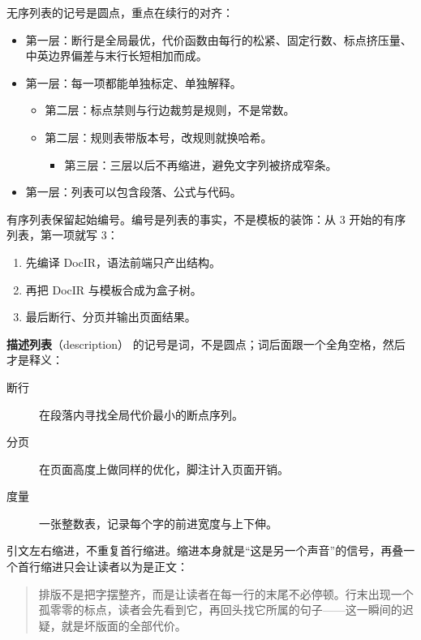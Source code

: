 \documentclass{article}
\newcommand{\term}[2]{\textbf{#1}（#2）}
\begin{document}
无序列表的记号是圆点，重点在续行的对齐：

\begin{itemize}
\item 第一层：断行是全局最优，代价函数由每行的松紧、固定行数、标点挤压量、中英边界偏差与末行长短相加而成。
\item 第一层：每一项都能单独标定、单独解释。
  \begin{itemize}
  \item 第二层：标点禁则与行边裁剪是规则，不是常数。
  \item 第二层：规则表带版本号，改规则就换哈希。
    \begin{itemize}
    \item 第三层：三层以后不再缩进，避免文字列被挤成窄条。
    \end{itemize}
  \end{itemize}
\item 第一层：列表可以包含段落、公式与代码。
\end{itemize}

有序列表保留起始编号。编号是列表的事实，不是模板的装饰：从 3 开始的有序列表，第一项就写 3：

\begin{enumerate}
\item 先编译 DocIR，语法前端只产出结构。
\item 再把 DocIR 与模板合成为盒子树。
\item 最后断行、分页并输出页面结果。
\end{enumerate}

\term{描述列表}{description} 的记号是词，不是圆点；词后面跟一个全角空格，然后才是释义：

\begin{description}
\item[断行] 在段落内寻找全局代价最小的断点序列。
\item[分页] 在页面高度上做同样的优化，脚注计入页面开销。
\item[度量] 一张整数表，记录每个字的前进宽度与上下伸。
\end{description}

引文左右缩进，不重复首行缩进。缩进本身就是“这是另一个声音”的信号，再叠一个首行缩进只会让读者以为是正文：

\begin{quote}
排版不是把字摆整齐，而是让读者在每一行的末尾不必停顿。行末出现一个孤零零的标点，读者会先看到它，再回头找它所属的句子——这一瞬间的迟疑，就是坏版面的全部代价。
\end{quote}
\end{document}
